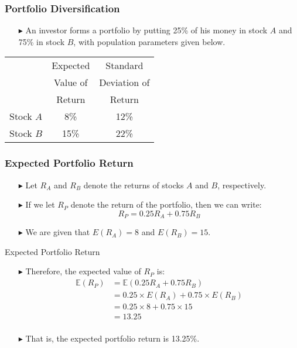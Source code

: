 \documentclass[12pt]{beamer}
\newcommand{\E}{\mathbb{E}}
\begin{document}
\begin{frame}
	\frametitle{Portfolio Diversification}
	
	\begin{itemize}
		\item[\color{blue}$\blacktriangleright$]An investor forms a portfolio by putting 25\% of his money in stock $A$ and 75\% in stock $B$, with population parameters given below.
	\end{itemize}
	
	\vspace{0.5cm}
	
	\begin{table}
		\centering
		\begin{tabular}{lcc}
			\toprule
			& Expected & Standard \\
			& Value of & Deviation of \\
			& Return & Return \\
			\midrule
			Stock $A$ & 8\% & 12\% \\
			Stock $B$ & 15\% & 22\% \\
			\bottomrule
		\end{tabular}
	\end{table}
	
\end{frame}

\begin{frame}
	\frametitle{Expected Portfolio Return}
	
	\begin{itemize}
		\item[\color{blue}$\blacktriangleright$] Let $R_A$ and $R_B$ denote the returns of stocks $A$ and $B$, respectively.
		\item[\color{blue}$\blacktriangleright$] If we let $R_P$ denote the return of the portfolio, then we can write:
		\[
		R_P = 0.25R_A + 0.75R_B
		\]
		\item[\color{blue}$\blacktriangleright$] We are given that $E(R_A) = 8$ and $E(R_B) = 15$.
	\end{itemize}
	
\end{frame}
\begin{frame}{Expected Portfolio Return}
	\begin{itemize}
		\item[\color{blue}$\blacktriangleright$]Therefore, the expected value of $R_P$ is:
	\begin{align*}
		\E(R_P) &= \E(0.25 R_A + 0.75 R_B)\\
		&= 0.25 \times E(R_A) + 0.75 \times E(R_B)\\
		&= 0.25 \times 8 + 0.75 \times 15\\
		&= 13.25\\
	\end{align*}
		\item[\color{blue}$\blacktriangleright$]That is, the expected portfolio return is 13.25\%.
	\end{itemize}
\end{frame}
\end{document}
